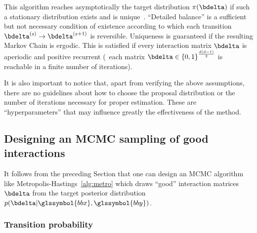 This algorithm reaches asymptotically the target distribution $\pi(\bdelta)$ if such a stationary distribution exists and is unique~\cite{meyn2012markov}. ``Detailed balance'' is a sufficient but not necessary condition of existence according to which each transition $\bdelta^{(s)} \rightarrow \bdelta^{(s+1)}$ is reversible. Uniqueness is guaranteed if the resulting Markov Chain is ergodic. This is satisfied if every interaction matrix $\bdelta$ is aperiodic and positive recurrent (\ each matrix $\bdelta \in {\{0,1\}}^{\frac{d(d-1)}{2}}$ is reachable in a finite number of iterations). 

It is also important to notice that, apart from verifying the above assumptions, there are no guidelines about how to choose the proposal distribution or the number of iterations necessary for proper estimation. These are ``hyperparameters'' that may influence greatly the effectiveness of the method.

\subsection{Designing an MCMC sampling of good interactions} \label{subsec:mcmc}

It follows from the preceding Section that one can design an MCMC algorithm like Metropolis-Hastings~\eqref{alg:metro} which draws ``good'' interaction matrices $\bdelta$ from the target posterior distribution $p(\bdelta | \glssymbol{bbx},\glssymbol{bby})$.

\subsubsection{Transition probability}

